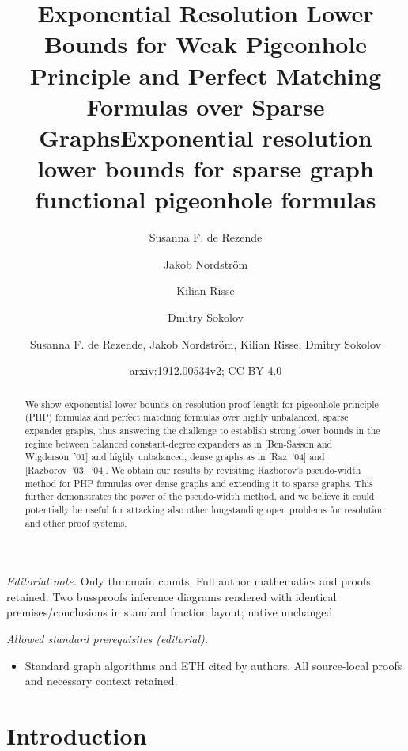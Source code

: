 \documentclass{article}
\author{Susanna F. de Rezende \and Jakob Nordström \and Kilian Risse \and Dmitry Sokolov}\date{}
\title{Exponential 
  Resolution
  Lower Bounds for Weak Pigeonhole Principle 
  and Perfect Matching Formulas over Sparse Graphs}
\title{Exponential resolution lower bounds for sparse graph functional pigeonhole formulas}
\author{Susanna F. de Rezende, Jakob Nordström, Kilian Risse, Dmitry Sokolov}
\date{arxiv:1912.00534v2; CC BY 4.0}
\numberwithin{equation}{section}
\begin{document}
\maketitle
\noindent\textit{Editorial note.} Only thm:main counts. Full author mathematics and proofs retained. Two bussproofs inference diagrams rendered with identical premises/conclusions in standard fraction layout; native unchanged.\par\medskip
\noindent\textit{Allowed standard prerequisites (editorial).}\begin{itemize}
\item Standard graph algorithms and ETH cited by authors. All source-local proofs and necessary context retained.
\end{itemize}\medskip
\maketitle







\begin{abstract}
  We show exponential lower bounds on resolution proof length for
  pigeonhole principle (PHP) formulas and perfect matching formulas
  over highly unbalanced, sparse expander graphs, thus answering the
  challenge to establish strong lower bounds in the regime between
  balanced constant-degree expanders as in [Ben-Sasson and
  Wigderson~'01] and highly unbalanced, dense graphs as in [Raz~'04]
  and [Razborov~'03,~'04].  We obtain our results by revisiting
  Razborov's pseudo-width method for PHP formulas over dense graphs
  and extending it to sparse graphs. This further demonstrates the
  power of the pseudo-width method, and we believe it could
  potentially be useful for attacking also other longstanding open
  problems for resolution and other proof systems.
\end{abstract}

\section{Introduction}
\label{sec:intro}
\end{document}
